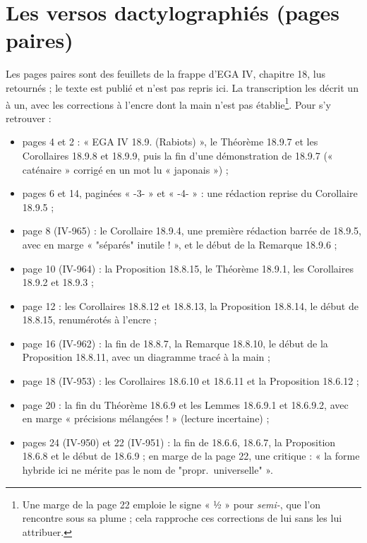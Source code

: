 \documentclass[11pt,a4paper]{article}
\begin{document}
\section*{Les versos dactylographiés (pages paires)}

Les pages paires sont des feuillets de la frappe d'EGA IV, chapitre 18,
lus retournés ; le texte est publié et n'est pas repris ici. La
transcription les décrit un à un, avec les corrections à l'encre dont la
main n'est pas établie\footnote{Une marge de la page 22 emploie le signe
« ½ » pour \emph{semi-}, que l'on rencontre sous sa plume ; cela rapproche
ces corrections de lui sans les lui attribuer.}. Pour s'y retrouver :
\begin{itemize}
  \item pages 4 et 2 : « EGA IV 18.9. (Rabiots) », le Théorème 18.9.7 et les
    Corollaires 18.9.8 et 18.9.9, puis la fin d'une démonstration de 18.9.7
    (« caténaire » corrigé en un mot lu « japonais ») ;
  \item pages 6 et 14, paginées « -3- » et « -4- » : une rédaction reprise
    du Corollaire 18.9.5 ;
  \item page 8 (IV-965) : le Corollaire 18.9.4, une première rédaction
    barrée de 18.9.5, avec en marge « "séparés" inutile ! », et le début de
    la Remarque 18.9.6 ;
  \item page 10 (IV-964) : la Proposition 18.8.15, le Théorème 18.9.1, les
    Corollaires 18.9.2 et 18.9.3 ;
  \item page 12 : les Corollaires 18.8.12 et 18.8.13, la Proposition
    18.8.14, le début de 18.8.15, renumérotés à l'encre ;
  \item page 16 (IV-962) : la fin de 18.8.7, la Remarque 18.8.10, le début
    de la Proposition 18.8.11, avec un diagramme tracé à la main ;
  \item page 18 (IV-953) : les Corollaires 18.6.10 et 18.6.11 et la
    Proposition 18.6.12 ;
  \item page 20 : la fin du Théorème 18.6.9 et les Lemmes 18.6.9.1 et
    18.6.9.2, avec en marge « précisions mélangées ! » (lecture incertaine) ;
  \item pages 24 (IV-950) et 22 (IV-951) : la fin de 18.6.6, 18.6.7, la
    Proposition 18.6.8 et le début de 18.6.9 ; en marge de la page 22, une
    critique : « la forme hybride ici ne mérite pas le nom de "propr.\
    universelle" ».
\end{itemize}
\end{document}
